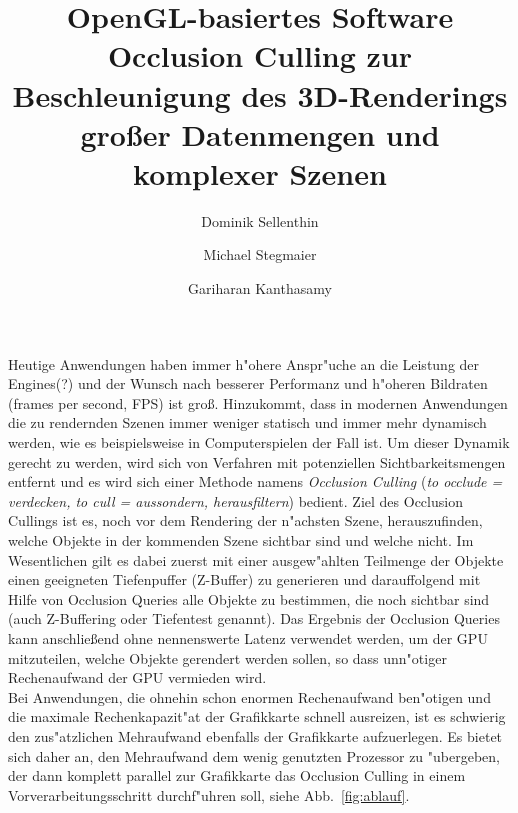 \documentclass[journal]{vgtc}
\author{Dominik Sellenthin \and Michael Stegmaier \and Gariharan Kanthasamy}
\title{OpenGL-basiertes Software Occlusion Culling zur Beschleunigung des 3D-Renderings gro{\ss}er Datenmengen und komplexer Szenen}
\begin{document}


\maketitle

Heutige Anwendungen haben immer h"ohere Anspr"uche an die Leistung der Engines(?) und der Wunsch nach besserer Performanz und h"oheren Bildraten (frames per second, FPS) ist gro{\ss}. Hinzukommt, dass in modernen Anwendungen die zu rendernden Szenen immer weniger statisch und immer mehr dynamisch werden, wie es beispielsweise in Computerspielen der Fall ist. Um dieser Dynamik gerecht zu werden, wird sich von Verfahren mit potenziellen Sichtbarkeitsmengen entfernt \cite{MSOC} und es wird sich einer Methode namens \textit{Occlusion Culling} (\textit{to occlude = verdecken, to cull = aussondern, herausfiltern}) bedient. Ziel des Occlusion Cullings ist es, noch vor dem Rendering der n"achsten Szene, herauszufinden, welche Objekte in der kommenden Szene sichtbar sind und welche nicht. Im Wesentlichen gilt es dabei zuerst mit einer ausgew"ahlten Teilmenge der Objekte einen geeigneten Tiefenpuffer (Z-Buffer) zu generieren und darauffolgend mit Hilfe von Occlusion Queries alle Objekte zu bestimmen, die noch sichtbar sind (auch Z-Buffering oder Tiefentest genannt). Das Ergebnis der Occlusion Queries kann anschlie{\ss}end ohne nennenswerte Latenz verwendet werden, um der GPU mitzuteilen, welche Objekte gerendert werden sollen, so dass unn"otiger Rechenaufwand der GPU vermieden wird.\\

Bei Anwendungen, die ohnehin schon enormen Rechenaufwand ben"otigen und die maximale Rechenkapazit"at der Grafikkarte schnell ausreizen, ist es schwierig den zus"atzlichen Mehraufwand ebenfalls der Grafikkarte aufzuerlegen. Es bietet sich daher an, den Mehraufwand dem wenig genutzten Prozessor zu "ubergeben, der dann komplett parallel zur Grafikkarte das Occlusion Culling in einem Vorverarbeitungsschritt durchf"uhren soll, siehe Abb.\ \ref{fig:ablauf}.
\end{document}
